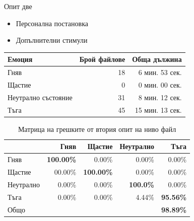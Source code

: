\documentclass[9pt]{beamer}
\begin{document}
    \begin{frame}[t]{Опит две}
            \begin{itemize}
                \pause
                \item Персонална постановка
                \pause
                \item Допълнителни стимули 
            \end{itemize}
            \pause
            \begin{center}
                \begin{tabular}{|l|r|r|} 
                    \hline
                    Емоция & Брой файлове & Обща дължина\\ 
                    \hline
                    Гняв & 18 & 6 мин. 53 сек.\\ 
                    Щастие & 0 & 0 мин. 00 сек. \\ 
                    Неутрално състояние & 31 & 8 мин. 12 сек. \\ 
                    Тъга & 45 & 15 мин. 13 сек. \\ 
                    \hline
                \end{tabular}
            \pause
            \begin{table}[h]
                \begin{center}
                    \begin{tabular}{|l|r r r r|} 
                        \hline
                        & Гняв & Щастие & Неутрално & Тъга \\ 
                        \hline
                        Гняв &  \textbf{100.00\%} & 0.00\% & 0.00\% & 0.00\% \\ 
                        Щастие & 00.00\% & \textbf{100.00\%} & 0.00\% & 0.00\% \\ 
                        Неутрално & 0.00\% & 0.00\% & \textbf{100.0\%} & 0.00\% \\ 
                        Тъга & 0.00\% & 0.00\% & 4.44\% & \textbf{95.56\%}\\ 
                        \hline
                        \hline
                        Общо & & & & \textbf{98.89\%}\\
                        \hline
                    \end{tabular}
                    \caption*{Матрица на грешките от втория опит на ниво файл}
                \end{center}
            \end{table}
            \end{center}
    \end{frame}
\end{document}
